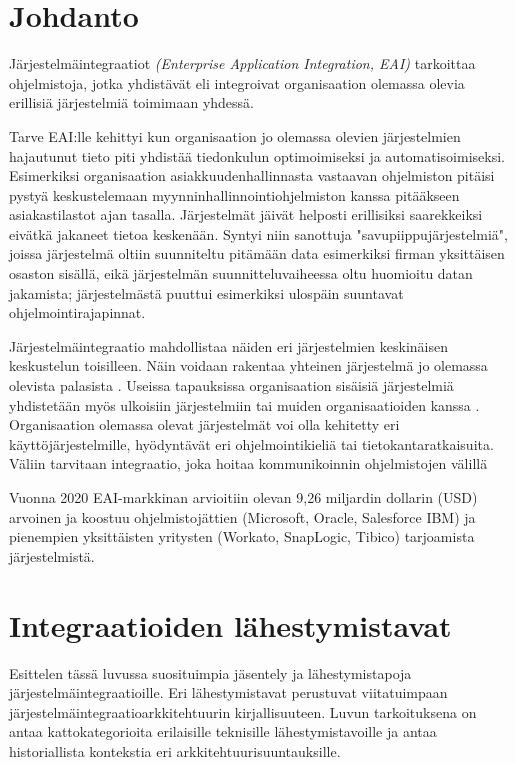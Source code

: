 
\chapter{Johdanto}


Järjestelmäintegraatiot \textit{(Enterprise Application Integration, EAI)} tarkoittaa ohjelmistoja, 
jotka yhdistävät eli integroivat organisaation olemassa olevia erillisiä järjestelmiä toimimaan yhdessä.

Tarve EAI:lle kehittyi kun organisaation jo olemassa olevien
järjestelmien hajautunut tieto piti yhdistää tiedonkulun optimoimiseksi ja
automatisoimiseksi. Esimerkiksi organisaation asiakkuudenhallinnasta vastaavan ohjelmiston
pitäisi pystyä keskustelemaan myynninhallinnointiohjelmiston kanssa pitääkseen
asiakastilastot ajan tasalla. 
Järjestelmät jäivät helposti erillisiksi saarekkeiksi eivätkä jakaneet tietoa keskenään. 
Syntyi niin sanottuja "savupiippujärjestelmiä", joissa järjestelmä oltiin suunniteltu pitämään data esimerkiksi firman yksittäisen osaston sisällä, eikä järjestelmän suunnitteluvaiheessa oltu huomioitu datan jakamista; järjestelmästä puuttui esimerkiksi ulospäin suuntavat ohjelmointirajapinnat. 

Järjestelmäintegraatio mahdollistaa näiden eri järjestelmien keskinäisen keskustelun toisilleen. Näin voidaan rakentaa yhteinen järjestelmä jo olemassa olevista palasista \citep[sivu 15]{linthicum2000enterprise}. Useissa tapauksissa organisaation sisäisiä järjestelmiä yhdistetään myös ulkoisiin järjestelmiin tai muiden organisaatioiden kanssa \citep{Johannesson2001}.
Organisaation olemassa olevat järjestelmät voi olla kehitetty eri käyttöjärjestelmille, hyödyntävät eri
ohjelmointikieliä tai tietokantaratkaisuita. Väliin tarvitaan integraatio, joka hoitaa
kommunikoinnin ohjelmistojen välillä


Vuonna 2020 EAI-markkinan arvioitiin olevan 9,26 miljardin dollarin (USD) arvoinen \citep{mordorintelligence} ja koostuu ohjelmistojättien (Microsoft, Oracle, Salesforce IBM) ja pienempien yksittäisten yritysten (Workato, SnapLogic, Tibico) tarjoamista järjestelmistä.


\chapter{Integraatioiden lähestymistavat}

Esittelen tässä luvussa suosituimpia jäsentely ja lähestymistapoja järjestelmäintegraatioille. Eri lähestymistavat perustuvat viitatuimpaan järjestelmäintegraatioarkkitehtuurin kirjallisuuteen. Luvun tarkoituksena on antaa kattokategorioita erilaisille teknisille lähestymistavoille ja antaa historiallista kontekstia eri arkkitehtuurisuuntauksille.

